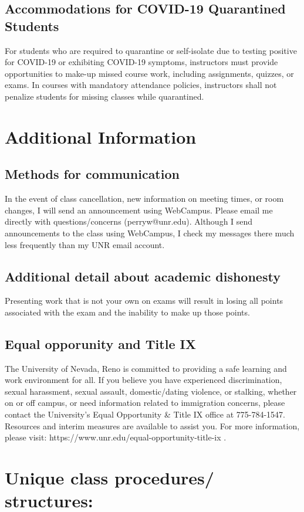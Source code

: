 \documentclass[11pt, a4paper]{article}
\begin{document}
\subsection*{Accommodations for COVID-19 Quarantined Students}
For students who are required to quarantine or self-isolate due to testing positive for COVID-19 or exhibiting COVID-19 symptoms, instructors must provide opportunities to make-up missed course work, including assignments, quizzes, or exams. In courses with mandatory attendance policies, instructors shall not penalize students for missing classes while quarantined.


\section*{Additional Information}
\subsection*{Methods for communication}
In the event of class cancellation, new information on meeting times,
or room changes, I will send an announcement using WebCampus. Please
email me directly with questions/concerns (perryw@unr.edu). Although I
send announcements to the class using WebCampus, I check my messages
there much less frequently than my UNR email account.

\subsection*{Additional detail about academic dishonesty}
Presenting work that is not your own on exams will result in losing
all points associated with the exam and the inability to make up those
points.


\subsection*{Equal opporunity and Title IX}
The University of Nevada, Reno is committed to providing a safe learning and work environment for all. If you believe you have experienced discrimination, sexual harassment, sexual assault, domestic/dating violence, or stalking, whether on or off campus, or need information related to immigration concerns, please contact the University's Equal Opportunity \& Title IX office at 775-784-1547. Resources and interim measures are available to assist you. For more information, please visit: https://www.unr.edu/equal-opportunity-title-ix .


\section*{Unique class procedures/ structures:}
\end{document}

